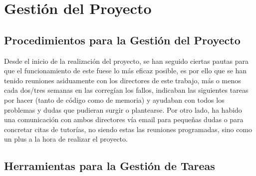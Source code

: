 \chapter{Gestión del Proyecto}
\label{cap:gestionProyecto}


\section{Procedimientos para la Gestión del Proyecto}
\label{cap:sec:procedimientosGestionProyecto}

Desde el inicio de la realización del proyecto, se han seguido ciertas pautas para que el funcionamiento de este fuese lo más eficaz posible, es por ello que se han tenido reuniones asiduamente con los directores de este trabajo, más o menos cada dos/tres semanas en las  corregían los fallos, indicaban las siguientes tareas por hacer (tanto de código como de memoria) y  ayudaban con todos los problemas y dudas que pudieran surgir o plantearse.
Por otro lado, ha habido una comunicación con ambos directores vía email para pequeñas dudas o para concretar citas de tutorías, no siendo estas las reuniones programadas, sino como un plus a la hora de realizar el proyecto.


\section{Herramientas para la Gestión de Tareas}
\label{cap:sec:herramientasGestionTareas}

